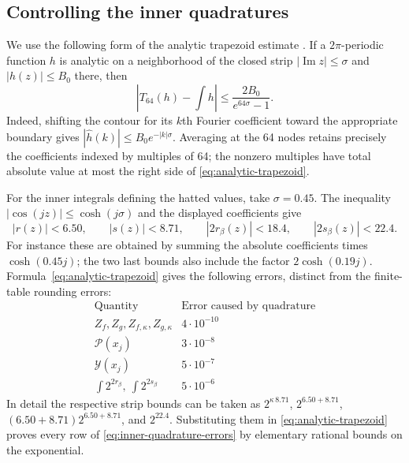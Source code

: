 \subsection{Controlling the inner quadratures}

We use the following form of the analytic trapezoid estimate
\cite[Theorem~3.2]{TrefethenWeideman2014}.  If a
$2\pi$-periodic function $h$ is analytic on a neighborhood of the
closed strip $|\operatorname{Im}z|\le\sigma$ and $|h(z)|\le B_0$
there, then
\begin{equation}\label{eq:analytic-trapezoid}
 \left|T_{64}(h)-\int h\right|
       \le\frac{2B_0}{e^{64\sigma}-1}.
\end{equation}
Indeed, shifting the contour for its $k$th Fourier coefficient toward
the appropriate boundary gives
$|\widehat h(k)|\le B_0e^{-|k|\sigma}$.  Averaging at the 64 nodes
retains precisely the coefficients indexed by multiples of 64; the
nonzero multiples have total absolute value at most the right side
of \eqref{eq:analytic-trapezoid}.

For the inner integrals defining the hatted values, take
$\sigma=0.45$.  The inequality
$|\cos(jz)|\le\cosh(j\sigma)$ and the displayed coefficients give
\[
 |r(z)|<6.50,\qquad |s(z)|<8.71,
 \qquad |2r_\beta(z)|<18.4,\qquad |2s_\beta(z)|<22.4.
\]
For instance these are obtained by summing the absolute coefficients
times $\cosh(0.45j)$; the two last bounds also include the factor
$2\cosh(0.19j)$.  Formula~\eqref{eq:analytic-trapezoid} gives the
following errors, distinct from the finite-table rounding errors:
\begin{equation}\label{eq:inner-quadrature-errors}
\begin{array}{c|c}
\text{Quantity}&\text{Error caused by quadrature}\\\hline
Z_f,Z_g,Z_{f,\kappa},Z_{g,\kappa}&4\cdot10^{-10}\\
\mathcal P(x_j)&3\cdot10^{-8}\\
\mathcal Y(x_j)&5\cdot10^{-7}\\
\int 2^{2r_\beta},\ \int 2^{2s_\beta}&5\cdot10^{-6}
\end{array}
\end{equation}
In detail the respective strip bounds can be taken as
$2^{\kappa\,8.71}$, $2^{6.50+8.71}$,
$(6.50+8.71)2^{6.50+8.71}$, and $2^{22.4}$.
Substituting them in \eqref{eq:analytic-trapezoid} proves every row of
\eqref{eq:inner-quadrature-errors} by elementary rational bounds on
the exponential.

